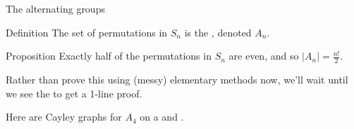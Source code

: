 \documentclass[8pt, handout]{beamer}
\newcommand{\Pause}{}      %
\begin{document}
\begin{frame}{The alternating groups} \smallskip

  \begin{block}{Definition}
    The set of  permutations in $S_n$ is the , denoted $A_n$.
  \end{block}

  \Pause
  
  \begin{block}{Proposition}
    Exactly half of the permutations in $S_n$ are even, and so 
    $\displaystyle |A_n|=\tfrac{n!}{2}$.
  \end{block}

  \smallskip\Pause
  
  Rather than prove this using (messy) elementary methods now, we'll
  wait until we see the  to get a 1-line
  proof. \medskip\Pause
  
  Here are Cayley graphs for $A_4$ on a  and
  .
  

\end{frame}
\end{document}
